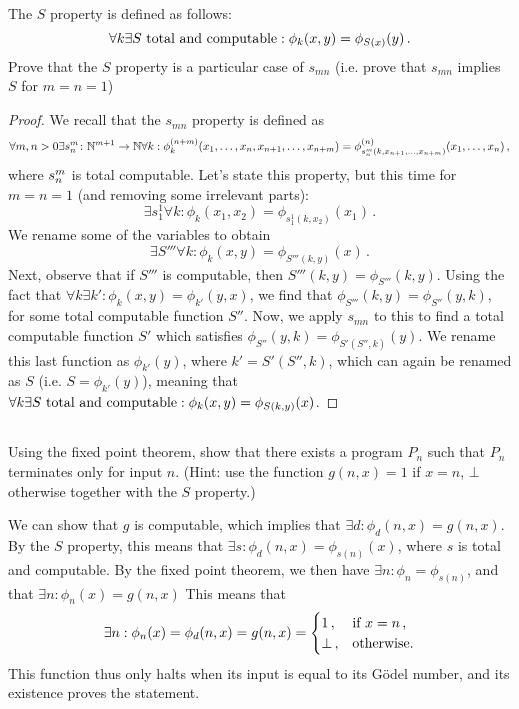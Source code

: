 \subsection{} %
The \(S\) property is defined as follows:
\[
\forall k \exists S \textnormal{ total and computable}: \phi_k(x, y) = \phi_{S(x)}(y)\,.
\]
Prove that the \(S\) property is a particular case of \(s_{mn}\)
(i.e. prove that \(s_{mn}\) implies \(S\) for \(m = n = 1\))

\begin{solution}
\begin{proof}
	We recall that the \(s_{mn}\) property is defined as
	\[
	\forall m,n > 0 \exists s^m_n \colon \mathbb{N}^{m+1} \to \mathbb{N} \forall k : \phi_{k}^{(n+m)}(x_1,\ldots, x_n, x_{n+1}, \ldots, x_{n+m})
	= \phi_{s^m_n(k, x_{n+1}, \ldots, x_{n+m})}^{(n)} (x_1, \ldots,x_n)\,,
	\]
	where \(s^m_n\) is total computable.
	Let's state this property, but this time for \(m = n = 1\)
	(and removing some irrelevant parts):
	\[
	\exists s_1^1 \forall k : \phi_k(x_1, x_2)
	= \phi_{s_1^1(k, x_2)}(x_1)\,.
	\]
	We rename some of the variables to obtain
	\[
	\exists S''' \forall k : \phi_k(x, y)
	= \phi_{S'''(k, y)}(x)\,.
	\]
	Next, observe that if \(S'''\) is computable,
	then \(S'''(k, y) = \phi_{S'''}(k, y)\).
	Using the fact that
	\(\forall k \exists k': \phi_k(x, y) = \phi_{k'}(y, x)\),
	we find that
	\(\phi_{S'''}(k, y) = \phi_{S''}(y, k)\),
	for some total computable function \(S''\).
	Now, we apply \(s_{mn}\) to this
	to find a total computable function \(S'\)
	which satisfies
	\(\phi_{S''}(y, k) = \phi_{S'(S'', k)}(y)\).
	We rename this last function as
	\(\phi_{k'}(y)\), where \(k' = S'(S'', k)\),
	which can again be renamed as \(S\) (i.e. \(S = \phi_{k'}(y)\)),
	meaning that
	\(\forall k \exists S \textnormal{ total and computable}:
	\phi_k(x, y) = \phi_{S(k, y)}(x)\).
\end{proof}
\end{solution}

\subsection{} %
Using the fixed point theorem, show that there exists a program \(P_n\)
such that \(P_n\) terminates only for input \(n\).
(Hint: use the function \(g(n, x) = 1\) if \(x = n\), \(\bot\) otherwise
together with the \(S\) property.)

\begin{solution}
	We can show that \(g\) is computable,
	which implies that
	\(\exists d : \phi_d(n, x) = g(n, x)\).
	By the \(S\) property,
	this means that \(\exists s: \phi_d(n, x) = \phi_{s(n)}(x)\),
	where \(s\) is total and computable.
	By the fixed point theorem,
	we then have \(\exists n : \phi_n = \phi_{s(n)}\),
	and that \(\exists n: \phi_n(x) = g(n, x)\)
	This means that
	\[
	\exists n: \phi_n(x) = \phi_d(n, x) = g(n, x) = \begin{cases}1\,, & \textnormal{if } x = n\,,\\ \bot\,, & \textnormal{otherwise.}\end{cases}
	\]
	This function thus only halts when its input
	is equal to its Gödel number,
	and its existence proves the statement.
\end{solution}

